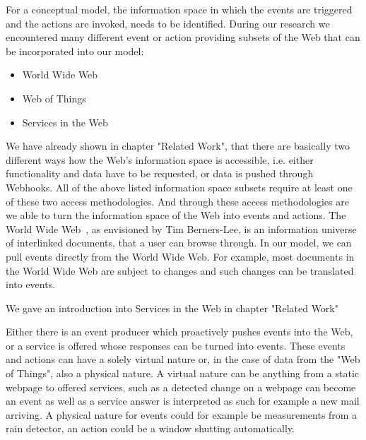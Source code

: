 For a conceptual model, the information space in which the events are triggered and the actions are invoked, needs to be identified.
During our research we encountered many different event or action providing subsets of the Web that can be incorporated into our model:
\begin{itemize}
  \item \textrm{World Wide Web}
  \item \textrm{Web of Things}
  \item Services in the Web
\end{itemize}
We have already shown in chapter "Related Work", that there are basically two different ways how the Web's information space is accessible, i.e. either functionality and data have to be requested, or data is pushed through Webhooks.
All of the above listed information space subsets require at least one of these two access methodologies.
And through these access methodologies are we able to turn the information space of the Web into events and actions.
The \textrm{World Wide Web}~\cite{DBLP:journals/en/Berners-LeeCGP92}, as envisioned by Tim Berners-Lee, is an information universe of interlinked documents, that a user can browse through.
In our model, we can pull events directly from the World Wide Web.
For example, most documents in the World Wide Web are subject to changes and such changes can be translated into events.

We gave an introduction into \textrm{Services in the Web} in chapter "Related Work"


Either there is an event producer which proactively pushes events into the Web, or a service is offered whose responses can be turned into events.
These events and actions can have a solely virtual nature or, in the case of data from the \textrm{"Web of Things"}, also a physical nature.
A virtual nature can be anything from a static webpage to offered services, such as a detected change on a webpage can become an event as well as a service answer is interpreted as such for example a new mail arriving.
A physical nature for events could for example be measurements from a rain detector, an action could be a window shutting automatically.

